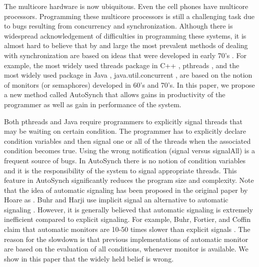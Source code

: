\documentclass[preprint]{sigplanconf}
\begin{document}
The multicore hardware is now ubiquitous. Even the cell phones have
multicore processors. Programming these multicore processors is
still a challenging task due to
bugs resulting from concurrency and synchronization.
Although there is widespread acknowledgement of difficulties 
in programming these systems, it is almost hard to believe that 
by and large the most prevalent methods of dealing with synchronization are
based on ideas that were developed in early 70's \cite{hoa74, bh75a}. For 
example, the most widely used threads package in C++ \cite{stro97}, 
pthreads \cite{bute97}, and the most widely used package in Java \cite{gjs00}, 
java.util.concurrent \cite{lea05}, are based
on the notion of monitors (or semaphores) developed in 60's and 70's.
In this paper, we propose a new method called AutoSynch 
that allows gains in productivity of the programmer as well as gain in
performance of the system.

Both pthreads and Java require programmers to explicitly
signal threads that may be waiting on certain condition. The programmer
has to explicitly declare condition variables and then signal one
or all of the threads when the associated condition becomes true.
Using the wrong notification (signal versus signalAll) is a frequent
source of bugs. In AutoSynch there is no notion of condition variables
and it is the responsibility of the system to signal appropriate threads.
This feature in AutoSynch significantly reduces the program size and complexity.
Note that the idea of automatic signaling has been proposed 
in the original paper by Hoare as \cite{hoa74}. Buhr and Harji use implicit
signal an alternative to automatic signaling \cite{bh05}. 
However, it is generally believed that automatic 
signaling is extremely inefficient compared to explicit signaling. 
For example, Buhr, Fortier, and Coffin claim that automatic monitors are 10-50 times
slower than explicit signals \cite{bfc95}. The reason for the slowdown is that
previous implementations of automatic monitor are based on the
evaluation of all conditions, whenever monitor is available. We show in this
paper that the widely held belief is wrong. 
\end{document}
